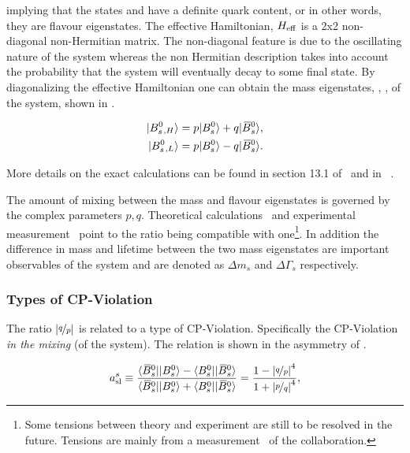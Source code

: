 \noindent implying that the states \Bs and \Bsb have a definite quark content, or in other words,
they are flavour eigenstates. The effective Hamiltonian, $H_{\rm eff}$ is a 2x2 non-diagonal non-Hermitian matrix.
The non-diagonal feature is due to the oscillating nature of the \BBbarSyst system whereas the non
Hermitian description takes into account the probability that the system will eventually decay to some final state.
By diagonalizing the effective Hamiltonian one can obtain the mass eigenstates, , ,
of the system, shown in .

\begin{align}
  \centering
  \ket{\Bs{}_{,H}} &= p \ket{\Bs} + q \ket{\Bsb}, \nonumber \\
  \ket{\Bs{}_{,L}} &= p \ket{\Bs} - q \ket{\Bsb}.
  \label{bs_mass_eigen}
\end{align}

More details on the exact calculations can be found in section 13.1 of~\cite{PDG} and in ~\cite{jeroenThesis,DeBruyn-thesis}.

The amount of mixing between the mass and flavour eigenstates is governed by the complex parameters $p,q$.
Theoretical calculations~\cite{Lenz:2011ti} and experimental measurement~\cite{asl-paper} point to the ratio
\qoverp being compatible with one\footnote{Some tensions between theory and experiment are still to be resolved in the future.
Tensions are mainly from a measurement~\cite{Abazov:2013uma} of the \dzero collaboration.}.
In addition the difference in mass and lifetime between the two mass eigenstates are important observables of the
\BBbarSyst system and are denoted as $\Delta m_s$ and $\Delta\Gamma_s$ respectively.

\subsubsection{Types of CP-Violation}
The ratio $|\nicefrac{q}{p}|$ is related to a type of CP-Violation. Specifically the CP-Violation {\it in the mixing} (of the \BBbarSyst system).
The relation is shown in the asymmetry of .

\begin{equation}
  \centering
  a_{\rm sl}^{s}  \equiv \frac{\bra{\Bsb}\ket{\Bs} - \bra{\Bs}\ket{\Bsb}} {\bra{\Bsb}\ket{\Bs} + \bra{\Bs}\ket{\Bsb}}
                       = \frac{1 - \left|\nicefrac{q}{p}\right|^4}{1 + \left|\nicefrac{p}{q}\right|^4},
  \label{acp_mixing}
\end{equation}

